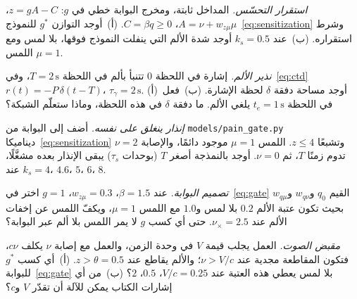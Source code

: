 \begin{exercise}[\lvlB]
\label{ex:14:3}
\emph{استقرار التحسّس.} المداخل ثابتة، ومخرج البوابة خطي في $g$: $z=gA-C$، $A=\nu+w_{z\mu}\mu$، $C=\beta q\ge0$. (أ)~أوجد التوازن $g^*$ للنموذج~\eqref{eq:sensitization} وشرط استقراره. (ب)~عند $k_s=0.5$ أوجد شدة الألم التي ينفلت النموذج فوقها، بلا لمس ومع اللمس $\mu=1$.
\end{exercise}

\begin{exercise}[\lvlA]
\label{ex:14:4}
\emph{نذير الألم.} إشارة في اللحظة $0$ تتنبأ بألم في اللحظة $T=2\,\text{s}$، وفي~\eqref{eq:ctd} $r(t)=-P\,\delta(t-T)$، $\tau_\gamma=2\,\text{s}$. (أ)~أوجد مساحة دفقة $\delta$ لحظة الإشارة. (ب)~فعل في اللحظة $t_e=1\,\text{s}$ يلغي الألم. ما دفقة $\delta$ في هذه اللحظة، وماذا ستعلّم الشبكة؟
\end{exercise}

\begin{exercise}[\lvlB]
\label{ex:14:5}
\emph{إنذار ينغلق على نفسه.} أضف إلى البوابة من \foreignlanguage{english}{\texttt{models/\allowbreak pain\_gate.py}} ديناميكا~\eqref{eq:sensitization} وتشبعًا $z\le4$. اللمس $\mu=1$ موجود دائمًا، والإصابة $\nu=2$ تدوم زمنًا $T$، ثم $\nu=0$. أوجد بالنمذجة أصغر $T$ (بوحدات $\tau_s$) يبقى الإنذار بعده مشغَّلًا، عند $k_s=4$، $4.6$، $5$، $6$، $8$.
\end{exercise}

\begin{exercise}[\lvlB]
\label{ex:14:6}
\emph{تصميم البوابة.} عند $\beta=1.5$، $w_{z\mu}=0.3$، $g=1$ اختر في~\eqref{eq:gate} القيم $q_0$ و$w_{q\nu}$ و$w_{q\mu}$ بحيث تكون عتبة الألم $0.2$ بلا لمس و$1.0$ مع اللمس $\mu=1$، ويكفّ اللمس عن إخفات الألم عند $\nu_\times=2.5$. حتى أي كسب $g$ لا يمر اللمس بلا ألم عبر البوابة؟
\end{exercise}

\begin{exercise}[\lvlC]
\label{ex:14:7}
\emph{مقبض الصوت.} العمل يجلب قيمة $V$ في وحدة الزمن، والعمل مع إصابة $\nu$ يكلف $c\nu$، فتكون المقاطعة مجدية عند $\nu>V/c$؛ والألم يقاطع عند $z>\theta=0.5$. (أ)~أي كسب $g^*$ للبوابة~\eqref{eq:gate} بلا لمس يعطي هذه العتبة عند $V/c=0.25$، $0.5$، $2$؟ (ب)~من أي إشارات الكتاب يمكن للآلة أن تقدّر $V$ و$c$؟
\end{exercise}
